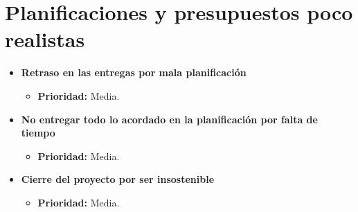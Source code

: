 \documentclass[spanish,a4paper,12pt]{report}	%
\begin{document}
\section{Planificaciones y presupuestos poco realistas}
	\begin{itemize}
		\item \textbf{Retraso en las entregas por mala planificación}
			\begin{itemize}
				\item \textbf{Prioridad: }Media.
			\end{itemize}
		
		\item \textbf{No entregar todo lo acordado en la planificación por falta de tiempo}
			\begin{itemize}
				\item \textbf{Prioridad: }Media.
			\end{itemize}
		
		\item \textbf{Cierre del proyecto por ser insostenible}
			\begin{itemize}
				\item \textbf{Prioridad: }Media.
			\end{itemize}
	\end{itemize}
%
\end{document}
